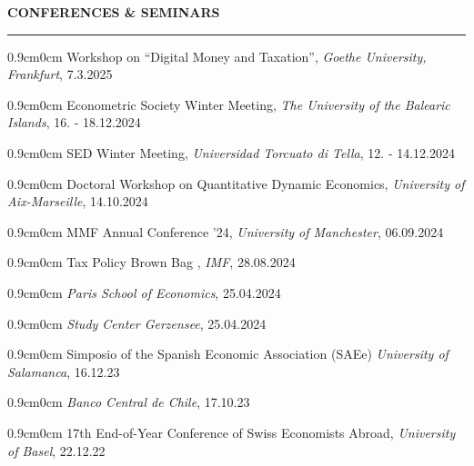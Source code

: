 \documentclass[letterpaper,11pt]{article}
\begin{document}
\vspace{0.5cm}
\textbf{CONFERENCES \& SEMINARS} \\
\vspace{1mm} \hrule
\vspace{1mm}
\begin{adjustwidth}{0.9cm}{0cm} Workshop on ``Digital Money and Taxation'', \textit{Goethe University, Frankfurt}, 7.3.2025 \tiny \normalsize \end{adjustwidth}
\begin{adjustwidth}{0.9cm}{0cm} Econometric Society Winter Meeting, \textit{The University of the Balearic Islands}, 16. - 18.12.2024 \tiny \normalsize \end{adjustwidth}
\begin{adjustwidth}{0.9cm}{0cm} SED Winter Meeting, \textit{Universidad Torcuato di Tella}, 12. - 14.12.2024 \tiny \normalsize\end{adjustwidth}
\begin{adjustwidth}{0.9cm}{0cm} Doctoral Workshop on Quantitative Dynamic Economics, \textit{University of Aix-Marseille}, 14.10.2024\end{adjustwidth}
\begin{adjustwidth}{0.9cm}{0cm} MMF Annual Conference '24, \textit{University of Manchester}, 06.09.2024\end{adjustwidth}
\begin{adjustwidth}{0.9cm}{0cm} Tax Policy Brown Bag , \textit{IMF}, 28.08.2024\end{adjustwidth}
\begin{adjustwidth}{0.9cm}{0cm} \textit{Paris School of Economics}, 25.04.2024\end{adjustwidth}
\begin{adjustwidth}{0.9cm}{0cm} \textit{Study Center Gerzensee}, 25.04.2024\end{adjustwidth}
\begin{adjustwidth}{0.9cm}{0cm} Simposio of the Spanish Economic Association (SAEe) \textit{University of Salamanca}, 16.12.23\end{adjustwidth}
\begin{adjustwidth}{0.9cm}{0cm} \textit{Banco Central de Chile}, 17.10.23\end{adjustwidth}
\begin{adjustwidth}{0.9cm}{0cm} 17th End-of-Year Conference of Swiss Economists Abroad, \textit{University of Basel}, 22.12.22\end{adjustwidth}
\end{document}

